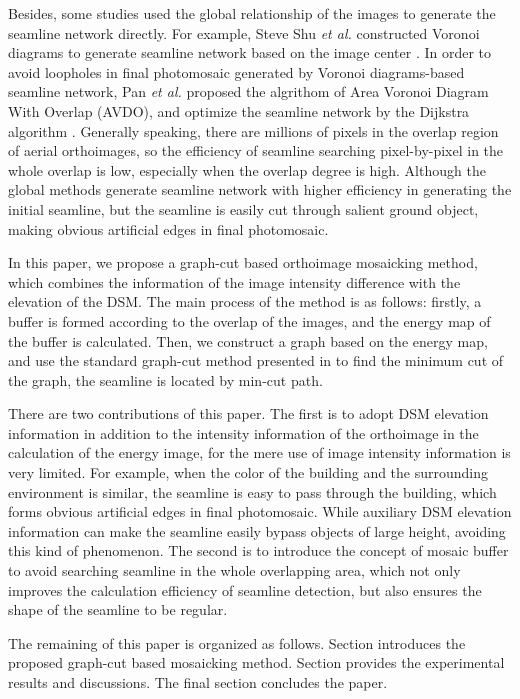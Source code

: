 \documentclass[journal]{IEEEtran}
\begin{document}
Besides, some studies used the global relationship of the images to generate the seamline network directly. For example, Steve Shu \textit{et al.} constructed Voronoi diagrams to generate seamline network based on the image center \cite{Hsu2002}. In order to avoid loopholes in final photomosaic generated by Voronoi diagrams-based seamline network, Pan \textit{et al.} proposed the algrithom of Area Voronoi Diagram With Overlap (AVDO), and optimize the seamline network by the Dijkstra algorithm \cite{Pan2009,Pan2014a}. Generally speaking, there are millions of pixels in the overlap region of aerial orthoimages, so the efficiency of seamline searching pixel-by-pixel in the whole overlap is low, especially when the overlap degree is high. Although the global methods generate seamline network with higher efficiency in generating the initial seamline, but the seamline is easily cut through salient ground object, making obvious artificial edges in final photomosaic. 

In this paper, we propose a graph-cut based orthoimage mosaicking method, which combines the information of the image intensity difference with the elevation of the DSM. The main process of the method is as follows: firstly, a buffer is formed according to the overlap of the images, and the energy map of the buffer is calculated. Then, we construct a graph based on the energy map, and use the standard graph-cut method presented in \cite{Boykov2004} to find the minimum cut of the graph, the seamline is located by min-cut path.

There are two contributions of this paper. The first is to adopt DSM elevation information in addition to the intensity information of the orthoimage in the calculation of the energy image, for the mere use of image intensity information is very limited. For example, when the color of the building and the surrounding environment is similar, the seamline is easy to pass through the building, which forms obvious artificial edges in final photomosaic. While auxiliary DSM elevation information can make the seamline easily bypass objects of large height, avoiding this kind of phenomenon. The second is to introduce the concept of mosaic buffer to avoid searching seamline in the whole overlapping area, which not only improves the calculation efficiency of seamline detection, but also ensures the shape of the seamline to be regular.

The remaining of this paper is organized as follows. Section \uppercase\expandafter{} introduces the proposed graph-cut based mosaicking method. Section \uppercase\expandafter{} provides the experimental results and discussions. The final section concludes the paper.
\end{document}
